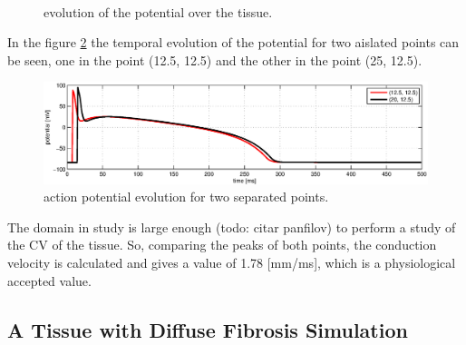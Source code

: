 \begin{figure}[H]
\centering
{} \\
\caption{evolution of the potential over the tissue.} \label{fig:results_exp1}
\end{figure}

In the figure \ref{fig:results_exp1_2points} the temporal evolution of the potential for two aislated points can be seen, one in the point (12.5, 12.5) and the other in the point (25, 12.5).

\begin{figure}[H]
\centering
\includegraphics[height = 4 cm]{fig/numerical_example_mde+min_exp1_point1}
\caption{action potential evolution for two separated points.} \label{fig:results_exp1_2points}
\end{figure}

The domain in study is large enough (todo: citar panfilov) to perform a study of the CV of the tissue. So, comparing the peaks of both points, the conduction velocity is calculated and gives a value of 1.78 [mm/ms], which is a physiological accepted value.

\newpage 
\subsection{A Tissue with Diffuse Fibrosis Simulation}

